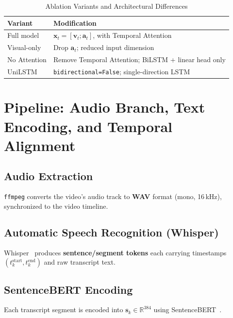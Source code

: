 \documentclass[10pt,conference]{IEEEtran}
\begin{document}
\begin{table}[h]
\centering
\caption{Ablation Variants and Architectural Differences}
\label{tab:ablations}
\begin{tabular}{ll}
\toprule
\textbf{Variant} & \textbf{Modification} \\
\midrule
Full model   & $\mathbf{x}_t = [\mathbf{v}_t;\mathbf{a}_t]$, with Temporal Attention \\
Visual-only  & Drop $\mathbf{a}_t$; reduced input dimension \\
No Attention & Remove Temporal Attention; BiLSTM + linear head only \\
UniLSTM      & \texttt{bidirectional=False}; single-direction LSTM \\
\bottomrule
\end{tabular}
\end{table}

\section{Pipeline: Audio Branch, Text Encoding, and Temporal Alignment}
\label{sec:audio}

\subsection{Audio Extraction}

\texttt{ffmpeg} converts the video's audio track to \textbf{WAV} format
(mono, 16\,kHz), synchronized to the video timeline.

\subsection{Automatic Speech Recognition (Whisper)}

Whisper~\cite{radford2023whisper} produces \textbf{sentence/segment tokens}
each carrying timestamps $(t_k^{\mathrm{start}}, t_k^{\mathrm{end}})$ and raw
transcript text.

\subsection{SentenceBERT Encoding}

Each transcript segment is encoded into
$\mathbf{s}_k \in \mathbb{R}^{384}$ using SentenceBERT~\cite{reimers2019}.
\end{document}
